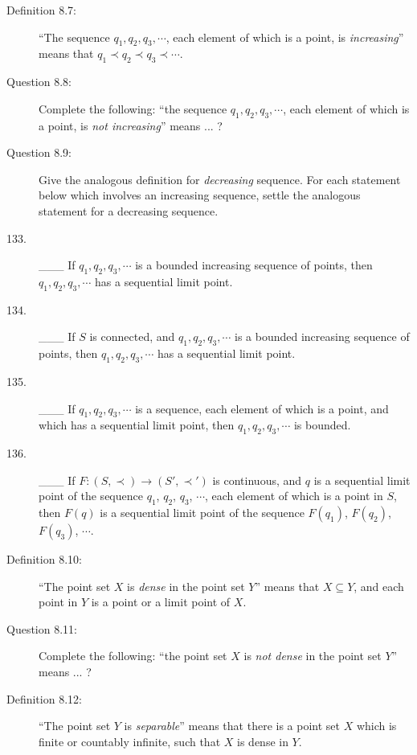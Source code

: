 \documentclass{book}
\begin{document}
\begin{description}
\item[Definition 8.7:] ``The sequence $q_{1}, q_{2}, q_{3}, \cdots$, each element of which is a point, is \emph{increasing}'' means that $q_{1} \prec q_{2} \prec q_{3} \prec \cdots$.

\item[Question 8.8:] Complete the following: ``the sequence $q_{1}, q_{2}, q_{3}, \cdots$, each element of which is a point, is \emph{not increasing}'' means ... ?

\item[Question 8.9:] Give the analogous definition for \emph{decreasing} sequence. For each statement below which involves an increasing sequence, settle the analogous statement for a decreasing sequence.

\item[133.] \_\_\_ If $q_{1}, q_{2}, q_{3}, \cdots$ is a bounded increasing sequence of points, then $\ \ \ \ \ $ $q_{1}, q_{2}, q_{3}, \cdots$ has a sequential limit point.

\item[134.] \_\_\_ If $S$ is connected, and $q_{1}, q_{2}, q_{3}, \cdots$ is a bounded increasing sequence of points, then $q_{1}, q_{2}, q_{3}, \cdots$ has a sequential limit point.

\item[135.] \_\_\_ If $q_{1}, q_{2}, q_{3}, \cdots$ is a sequence, each element of which is a point, and which has a sequential limit point, then $q_{1}, q_{2}, q_{3}, \cdots$ is bounded.

\item[136.] \_\_\_ If $F: (S, \prec) \rightarrow (S', \prec ')$ is continuous, and $q$ is a sequential limit point of the sequence $q_{1}$, $q_{2}$, $q_{3}$, $\cdots$, each element of which is a point in $S$, then $F(q)$ is a sequential limit point of the sequence $F(q_{1})$, $F(q_{2})$, $F(q_{3})$, $\cdots$.

\item[Definition 8.10:] ``The point set $X$ is \emph{dense} in the point set $Y$'' means that $X \subseteq Y$, and each point in $Y$ is a point or a limit point of $X$.

\item[Question 8.11:] Complete the following: ``the point set $X$ is \emph{not dense} in the point set $Y$'' means ... ?

\item[Definition 8.12:] ``The point set $Y$ is \emph{separable}'' means that there is a point set $X$ which is finite or countably infinite, such that $X$ is dense in $Y$.


\end{description}
\end{document}
